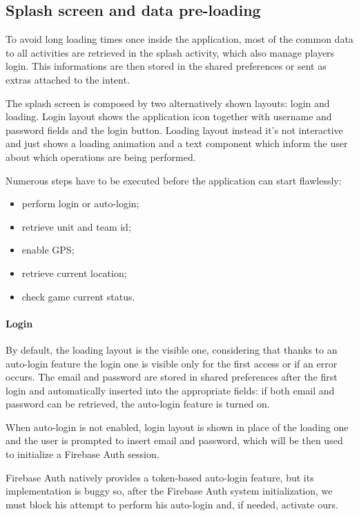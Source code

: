 		\subsection{Splash screen and data pre-loading}\label{focus:splash}
		
			To avoid long loading times once inside the application, most of the common data to all activities are retrieved in the splash activity, which also manage players login.
			This informations are then stored in the shared preferences or sent as extras attached to the intent.
			
			The splash screen is composed by two alternatively shown layouts: login and loading.
			Login layout shows the application icon together with username and password fields and the login button.
			Loading layout instead it's not interactive and just shows a loading animation and a text component which inform the user about which operations are being performed.
			
			Numerous steps have to be executed before the application can start flawlessly:
			\begin{itemize}
				\item perform login or auto-login;
				\item retrieve unit and team id;
				\item enable GPS;
				\item retrieve current location;
				\item check game current status.
			\end{itemize}
			
			\paragraph{Login}
			By default, the loading layout is the visible one, considering that thanks to an auto-login feature the login one is visible only for the first access or if an error occurs.
			The email and password are stored in shared preferences after the first login and automatically inserted into the appropriate fields: if both email and password can be retrieved, the auto-login feature is turned on.
			
			When auto-login is not enabled, login layout is shown in place of the loading one and the user is prompted to insert email and password, which will be then used to initialize a Firebase Auth session.
			
			Firebase Auth natively provides a token-based auto-login feature, but its implementation is buggy so, after the Firebase Auth system initialization, we must block his attempt to perform his auto-login and, if needed, activate ours.
			
